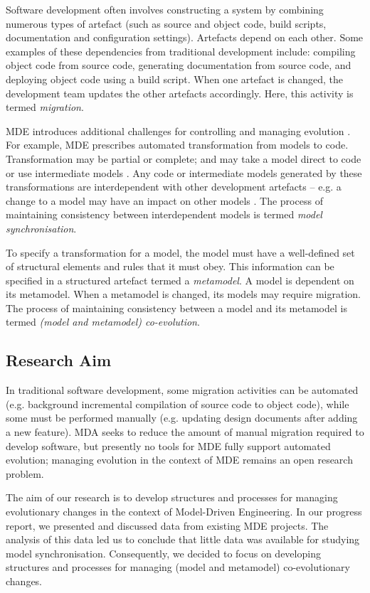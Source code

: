 Software development often involves constructing a system by combining numerous types of artefact (such as source and object code, build scripts, documentation and configuration settings). Artefacts depend on each other. Some examples of these dependencies from traditional development include: compiling object code from source code, generating documentation from source code, and deploying object code using a build script. When one artefact is changed, the development team updates the other artefacts accordingly. Here, this activity is termed \textit{migration}.

MDE introduces additional challenges for controlling and managing evolution \cite{mens07softwareevolution}. For example, MDE prescribes automated transformation from models to code. Transformation may be partial or complete; and may take a model direct to code or use intermediate models \cite{kleppe03mda}. Any code or intermediate models generated by these transformations are interdependent with other development artefacts -- e.g. a change to a model may have an impact on other models \cite{deursen07mdse}. The process of maintaining consistency between interdependent models is termed \textit{model synchronisation}.

To specify a transformation for a model, the model must have a well-defined set of structural elements and rules that it must obey. This information can be specified in a structured artefact termed a \emph{metamodel}. A model is dependent on its metamodel. When a metamodel is changed, its models may require migration. The process of maintaining consistency between a model and its metamodel is termed \textit{(model and metamodel) co-evolution}.

\subsection{Research Aim}
In traditional software development, some migration activities can be automated (e.g. background incremental compilation of source code to object code), while some must be performed manually (e.g. updating design documents after adding a new feature). MDA seeks to reduce the amount of manual migration required to develop software, but presently no tools for MDE fully support automated evolution; managing evolution in the context of MDE remains an open research problem.

The aim of our research is to develop structures and processes for managing evolutionary changes in the context of Model-Driven Engineering. In our progress report, we presented and discussed data from existing MDE projects. The analysis of this data led us to conclude that little data was available for studying model synchronisation. Consequently, we decided to focus on developing structures and processes for managing (model and metamodel) co-evolutionary changes.